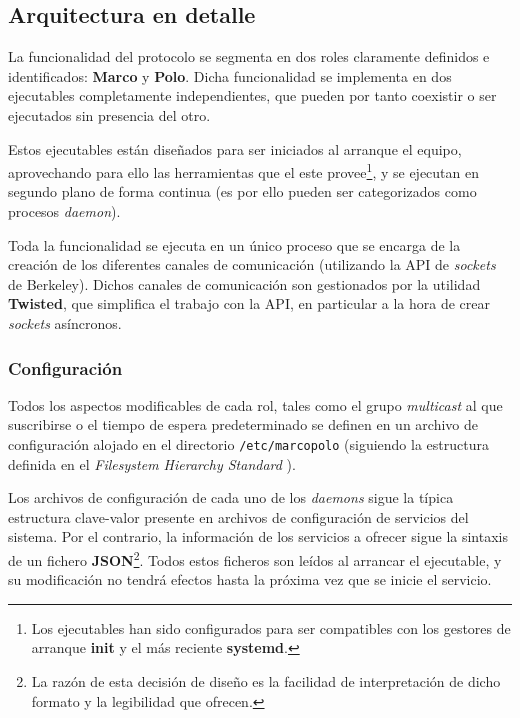 \subsection{Arquitectura en detalle}

La funcionalidad del protocolo se segmenta en dos roles claramente definidos e identificados: \textbf{Marco} y \textbf{Polo}. Dicha funcionalidad se implementa en dos ejecutables completamente independientes, que pueden por tanto coexistir o ser ejecutados sin presencia del otro.

Estos ejecutables están diseñados para ser iniciados al arranque el equipo, aprovechando para ello las herramientas que el este provee\footnote{Los ejecutables han sido configurados para ser compatibles con los gestores de arranque \textbf{init} y el más reciente \textbf{systemd}.}, y se ejecutan en segundo plano de forma continua (es por ello pueden ser categorizados como procesos \textit{daemon}).

Toda la funcionalidad se ejecuta en un único proceso que se encarga de la creación de los diferentes canales de comunicación (utilizando la API de \textit{sockets} de Berkeley). Dichos canales de comunicación son gestionados por la utilidad \textbf{Twisted}\citationneeded, que simplifica el trabajo con la API, en particular a la hora de crear \textit{sockets} asíncronos.

\subsubsection{Configuración}

Todos los aspectos modificables de cada rol, tales como el grupo \textit{multicast} al que suscribirse o el tiempo de espera predeterminado se definen en un archivo de configuración alojado en el directorio \texttt{/etc/marcopolo} (siguiendo la estructura definida en el \textit{Filesystem Hierarchy Standard} \cite{fhs}).


Los archivos de configuración de cada uno de los \textit{daemons} sigue la típica estructura clave-valor presente en archivos de configuración de servicios del sistema. Por el contrario, la información de los servicios a ofrecer sigue la sintaxis de un fichero \textbf{JSON}\footnote{La razón de esta decisión de diseño es la facilidad de interpretación de dicho formato y la legibilidad que ofrecen.}. Todos estos ficheros son leídos al arrancar el ejecutable, y su modificación no tendrá efectos hasta la próxima vez que se inicie el servicio.%

